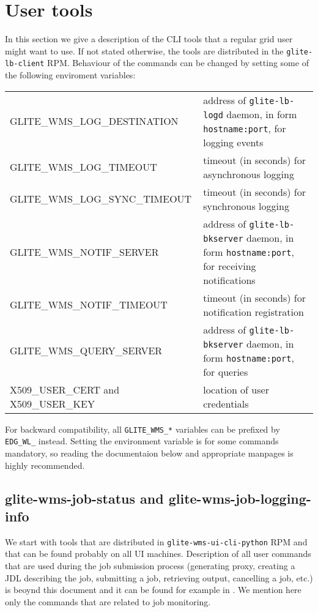 \section{User tools}
\label{s:lb-tools}

In this section we give a description of the CLI tools that a regular grid user
might want to use. If not stated otherwise, the tools are distributed in the
\verb'glite-lb-client' RPM. Behaviour of the commands can be changed by
setting some of the following enviroment variables:


\begin{tabularx}{\textwidth}{lX}
GLITE\_WMS\_LOG\_DESTINATION & address of \verb'glite-lb-logd' daemon, in form \verb'hostname:port', for logging events\\
GLITE\_WMS\_LOG\_TIMEOUT & timeout (in seconds) for asynchronous logging\\
GLITE\_WMS\_LOG\_SYNC\_TIMEOUT & timeout (in seconds) for synchronous logging\\
GLITE\_WMS\_NOTIF\_SERVER& address of \verb'glite-lb-bkserver' daemon, in form \verb'hostname:port', for receiving notifications\\
GLITE\_WMS\_NOTIF\_TIMEOUT& timeout (in seconds) for notification registration\\
GLITE\_WMS\_QUERY\_SERVER& address of \verb'glite-lb-bkserver' daemon, in form \verb'hostname:port', for queries\\
X509\_USER\_CERT and X509\_USER\_KEY & location of user credentials\\
\end{tabularx}
For backward compatibility, all \verb'GLITE_WMS_*' variables can be prefixed by 
\verb'EDG_WL_' instead. Setting the environment variable is for some commands mandatory,
so reading the documentaion below and appropriate manpages is highly recommended.


\subsection{glite-wms-job-status and glite-wms-job-logging-info}

We start with tools that are distributed in \verb'glite-wms-ui-cli-python' RPM
and that can be found probably on all UI machines. Description of all user
commands that are used during the job submission process (generating proxy,
creating a JDL describing the job, submitting a job, retrieving output,
cancelling a job, etc.) is beoynd this document and it can be found for example
in \cite{wmsug}. We mention here only the commands that are related to
job monitoring.

